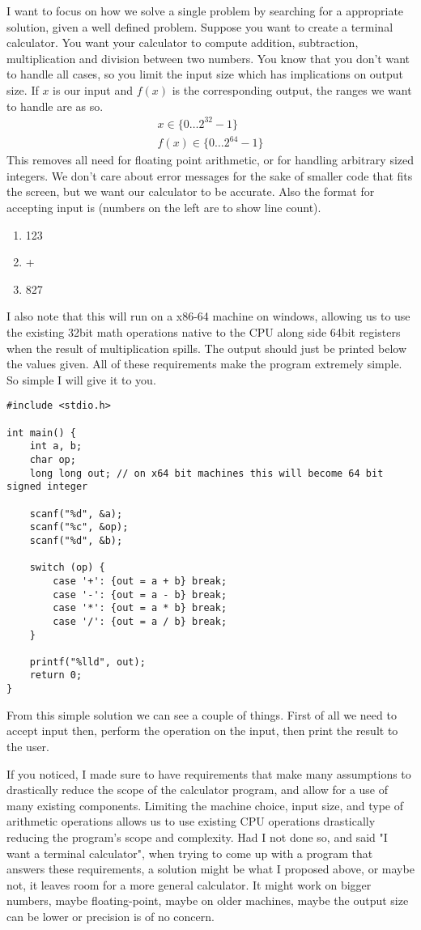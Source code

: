 \documentclass[a4paper]{article}
\begin{document}
I want to focus on how we solve a single problem by searching for a appropriate solution, 
given a well defined problem. Suppose you want to create a terminal calculator. You want 
your calculator to compute addition, subtraction, multiplication and division between two 
numbers. You know that you don't want to handle all cases, so you limit the input size 
which has implications on output size. If $x$ is our input and $f(x)$ is the corresponding 
output, the ranges we want to handle are as so. 
\begin{align*}
    x \in \{0 \dots 2^{32}-1\} \\
    f(x) \in \{0 \dots 2^{64}-1\}
\end{align*}
This removes all need for floating point arithmetic, or for handling arbitrary sized integers.
We don't care about error messages for the sake of smaller code that fits the screen, but we 
want our calculator to be accurate. Also the format for accepting input is (numbers on the 
left are to show line count).
\begin{enumerate}
    \item 123
    \item +
    \item 827
\end{enumerate} 
I also note that this will run on a x86-64 machine on windows, allowing us to use the 
existing 32bit math operations native to the CPU along side 64bit registers when the 
result of multiplication spills. The output should just be printed below the values given.
All of these requirements make the program extremely simple. So simple I will give it to you.
\pagebreak
\begin{lstlisting}
#include <stdio.h>

int main() { 
    int a, b;
    char op; 
    long long out; // on x64 bit machines this will become 64 bit signed integer

    scanf("%d", &a);
    scanf("%c", &op);
    scanf("%d", &b);
    
    switch (op) {
        case '+': {out = a + b} break;
        case '-': {out = a - b} break;
        case '*': {out = a * b} break;
        case '/': {out = a / b} break;
    }

    printf("%lld", out);
    return 0;
}
\end{lstlisting}
From this simple solution we can see a couple of things. First of all we need to accept input
then, perform the operation on the input, then print the result to the user. 

If you noticed, I made sure to have requirements that make many assumptions to drastically 
reduce the scope of the calculator program, and allow for a use of many existing components. 
Limiting the machine choice, input size, and type of arithmetic operations allows us to use
existing CPU operations drastically reducing the program's scope and complexity. Had I not 
done so, and said "I want a terminal calculator", when trying to come up with a program that 
answers these requirements, a solution might be what I proposed above, or maybe not, it leaves
room for a more general calculator. It might work on bigger numbers, maybe floating-point,
maybe on older machines, maybe the output size can be lower or precision is of no concern.
\end{document}
